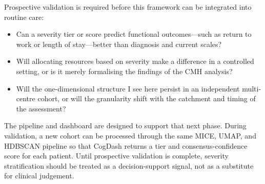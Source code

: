 Prospective validation is required before this framework can be integrated into routine care:
\begin{itemize}
    \item Can a severity tier or score predict functional outcomes---such as return to work or length of stay---better than diagnosis and current scales?
    \item Will allocating resources based on severity make a difference in a controlled setting, or is it merely formalising the findings of the CMH analysis?
    \item Will the one-dimensional structure I see here persist in an independent multi-centre cohort, or will the granularity shift with the catchment and timing of the assessment?
\end{itemize}
The pipeline and dashboard are designed to support that next phase. During validation, a new cohort can be processed through the same MICE, UMAP, and HDBSCAN pipeline so that CogDash returns a tier and consensus-confidence score for each patient. Until prospective validation is complete, severity stratification should be treated as a decision-support signal, not as a substitute for clinical judgement.
